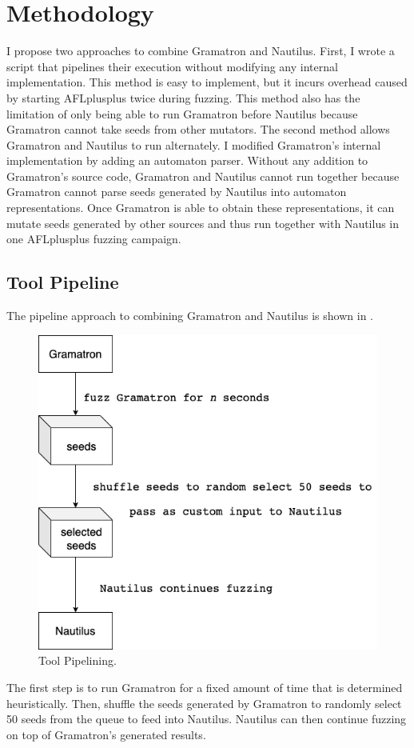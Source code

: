 \section{Methodology}
\label{sec:methodology}
I propose two approaches to combine Gramatron and Nautilus. First, I wrote a script that pipelines their execution without modifying any internal implementation. This method is easy to implement, but it incurs overhead caused by starting AFLplusplus twice during fuzzing. This method also has the limitation of only being able to run Gramatron before Nautilus because Gramatron cannot take seeds from other mutators. The second method allows Gramatron and Nautilus to run alternately. I modified Gramatron's internal implementation by adding an automaton parser. Without any addition to Gramatron's source code, Gramatron and Nautilus cannot run together because Gramatron cannot parse seeds generated by Nautilus into automaton representations. Once Gramatron is able to obtain these representations, it can mutate seeds generated by other sources and thus run together with Nautilus in one AFLplusplus fuzzing campaign. 

\subsection{Tool Pipeline}
The pipeline approach to combining Gramatron and Nautilus is shown in .
\begin{figure}[h]
  \centering
  \includegraphics[scale=0.4]{images/pipeline.png}
  \caption{Tool Pipelining.}\label{tool-pipelining}
\end{figure}
The first step is to run Gramatron for a fixed amount of time that is determined heuristically. Then, shuffle the seeds generated by Gramatron to randomly select 50 seeds from the queue to feed into Nautilus. Nautilus can then continue fuzzing on top of Gramatron's generated results. 

